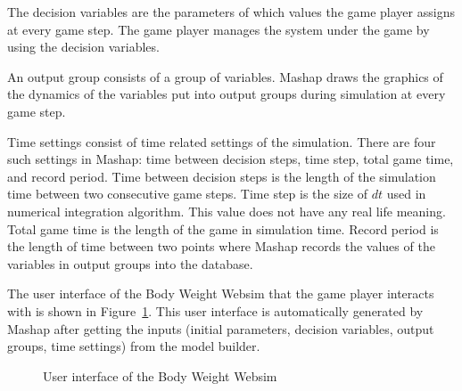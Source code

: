 \documentclass[12pt,a4paper]{paper}
\begin{document}
The decision variables are the parameters of which values the game player assigns at every game step. The game player manages the system under the game by using the decision variables. 

An output group consists of a group of variables. Mashap draws the graphics of the dynamics of the variables put into output groups during simulation at every game step.

Time settings consist of time related settings of the simulation. There are four such settings in Mashap: time between decision steps, time step, total game time, and record period. Time between decision steps is the length of the simulation time between two consecutive game steps. Time step is the size of $dt$ used in numerical integration algorithm. This value does not have any real life meaning. Total game time is the length of the game in simulation time. Record period is the length of time between two points where Mashap records the values of the variables in output groups into the database.

The user interface of the Body Weight Websim that the game player interacts with is shown in Figure~\ref{fig:user_interface_for_game_player}. This user interface is automatically generated by Mashap after getting the inputs (initial parameters, decision variables, output groups, time settings) from the model builder.

\begin{figure}
	\centering
\caption{User interface of the Body Weight Websim}%
\label{fig:user_interface_for_game_player}%
\end{figure}
\end{document}
